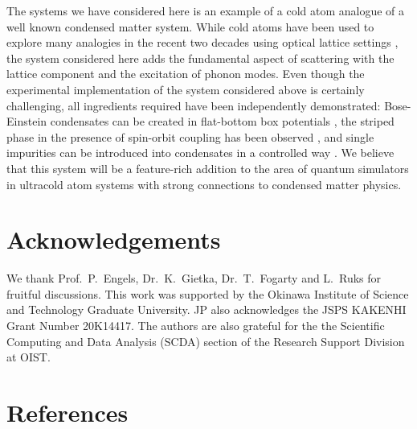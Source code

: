 \documentclass[12pt]{iopart}
\begin{document}
The systems we have considered here is an example of a cold atom analogue of a well known condensed matter system. While cold atoms have been used to explore many analogies in the recent two decades using optical lattice settings \cite{Bloch:08}, the system considered here adds the fundamental aspect of scattering with the lattice component and the excitation of phonon modes. 
Even though the experimental implementation of the system considered above is certainly challenging, all ingredients required have been independently demonstrated: Bose-Einstein condensates can be created in flat-bottom box potentials \cite{hadzibabic:2013}, the striped phase in the presence of spin-orbit coupling has been observed \cite{li_2017}, and single impurities can be introduced into condensates in a controlled way \cite{Schmidt:18}. We believe that this system will be a feature-rich addition to the area of quantum simulators in ultracold atom systems with strong connections to condensed matter physics.

\section*{Acknowledgements}
We thank Prof.~P.~Engels, Dr.~K.~Gietka, Dr.~T.~Fogarty and L.~Ruks for fruitful discussions. This work was supported by the Okinawa Institute of Science and Technology Graduate University.
JP also acknowledges the JSPS KAKENHI Grant Number 20K14417. The authors are also grateful for the the Scientific Computing and Data Analysis (SCDA) section of the Research Support Division at OIST.

\newpage
\section*{References}


\end{document}
